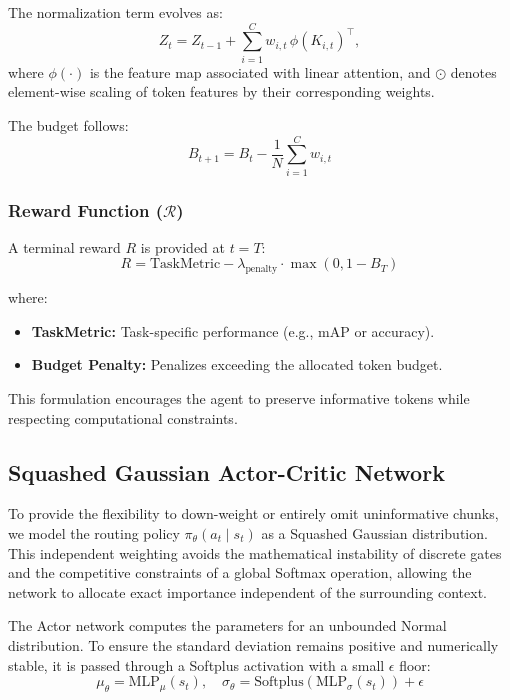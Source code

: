 The normalization term evolves as:
\begin{equation}
Z_t = Z_{t-1} + \sum_{i=1}^{C} w_{i,t} \, \phi(K_{i,t})^\top ,
\end{equation}
where $\phi(\cdot)$ is the feature map associated with linear attention, and $\odot$ denotes element-wise scaling of token features by their corresponding weights.

The budget follows:
\begin{equation}
B_{t+1} = B_t - \frac{1}{N} \sum_{i=1}^{C} w_{i,t}
\end{equation}

\subsubsection{Reward Function ($\mathcal{R}$)}
A terminal reward $R$ is provided at $t = T$:
\begin{equation}
R = \mathrm{TaskMetric} - \lambda_{\text{penalty}} \cdot \max(0, 1 - B_T)
\end{equation}

where:
\begin{itemize}
    \item \textbf{TaskMetric:} Task-specific performance (e.g., mAP or accuracy).
    \item \textbf{Budget Penalty:} Penalizes exceeding the allocated token budget.
\end{itemize}

This formulation encourages the agent to preserve informative tokens while respecting computational constraints.

\subsection{Squashed Gaussian Actor-Critic Network}
To provide the flexibility to down-weight or entirely omit uninformative chunks, we model the routing policy $\pi_\theta(a_t \mid s_t)$ as a Squashed Gaussian distribution. This independent weighting avoids the mathematical instability of discrete gates and the competitive constraints of a global Softmax operation, allowing the network to allocate exact importance independent of the surrounding context. 

The Actor network computes the parameters for an unbounded Normal distribution. To ensure the standard deviation remains positive and numerically stable, it is passed through a Softplus activation with a small $\epsilon$ floor:
$$ \mu_\theta = \text{MLP}_\mu(s_t), \quad \sigma_\theta = \text{Softplus}(\text{MLP}_\sigma(s_t)) + \epsilon $$

